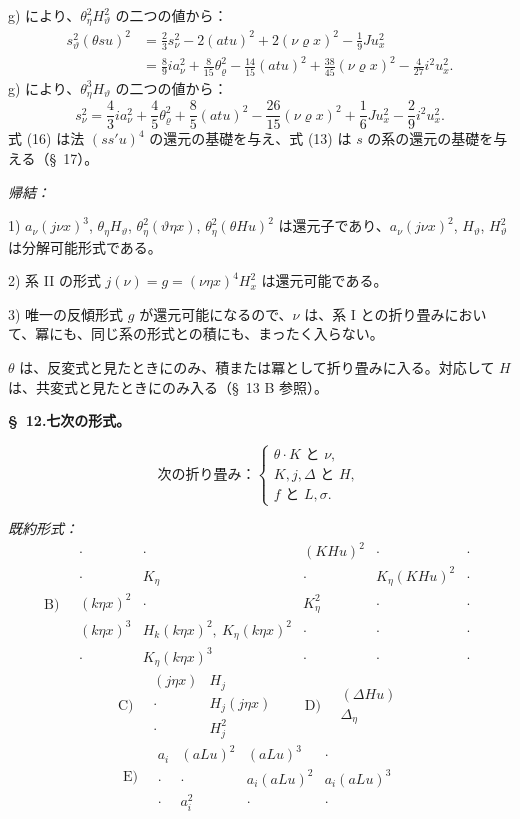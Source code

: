 \documentclass[11pt]{jlreq}
\newcommand{\A}{\Delta}
\newcommand{\R}{\varrho}
\begin{document}
g) により、$\theta_\eta^2H_\vartheta^2$ の二つの値から：
\[
\tag{15}
\begin{aligned}
s_\vartheta^2(\theta su)^2
&=\frac23s_\nu^2-2(atu)^2+2(\nu\R x)^2-\frac19Ju_x^2\\
&=\frac89ia_\nu^2+\frac8{15}\theta_\R^2-\frac{14}{15}(atu)^2+\frac{38}{45}(\nu\R x)^2-\frac4{27}i^2u_x^2.
\end{aligned}
\]
g) により、$\theta_\eta^3H_\vartheta$ の二つの値から：
\[
\tag{16}
s_\nu^2=\frac43ia_\nu^2+\frac45\theta_\R^2+\frac85(atu)^2-\frac{26}{15}(\nu\R x)^2+\frac16Ju_x^2-\frac29i^2u_x^2.
\]
式 (16) は法 $(ss'u)^4$ の還元の基礎を与え、式 (13) は $s$ の系の還元の基礎を与える（\S\ 17）。

\noindent\emph{帰結：}

1) $a_\nu(j\nu x)^3$, $\theta_\eta H_\vartheta$, $\theta_\eta^2(\vartheta\eta x)$, $\theta_\eta^2(\theta Hu)^2$ は還元子であり、$a_\nu(j\nu x)^2$, $H_\vartheta$, $H_\vartheta^2$ は分解可能形式である。

2) 系 II の形式 $j(\nu)=g=(\nu\eta x)^4H_x^2$ は還元可能である。

3) 唯一の反傾形式 $g$ が還元可能になるので、$\nu$ は、系 I との折り畳みにおいて、冪にも、同じ系の形式との積にも、まったく入らない。

$\theta$ は、反変式と見たときにのみ、積または冪として折り畳みに入る。対応して $H$ は、共変式と見たときにのみ入る（\S\ 13 B 参照）。




\begin{center}
\textbf{\S\ 12.\quad 七次の形式。}
\end{center}
\[
\text{次の折り畳み：}\left\{\begin{array}{l}
\theta\cdot K\text{ と }\nu,\\
K,j,\A\text{ と }H,\\
f\text{ と }L,\sigma.
\end{array}\right.
\]

\noindent\emph{既約形式：}
\[
\text{B)}\quad
\begin{array}{c|c|c|c|c}
\cdot&\cdot&(KHu)^2&\cdot&\cdot\\
\cdot&K_\eta&\cdot&K_\eta(KHu)^2&\cdot\\
(k\eta x)^2&\cdot&K_\eta^2&\cdot&\cdot\\
(k\eta x)^3&H_k(k\eta x)^2,\ K_\eta(k\eta x)^2&\cdot&\cdot&\cdot\\
\cdot&K_\eta(k\eta x)^3&\cdot&\cdot&\cdot
\end{array}
\]
\[
\text{C)}\quad
\begin{array}{cc}
(j\eta x)&H_j\\
\cdot&H_j(j\eta x)\\
\cdot&H_j^2
\end{array}
\qquad
\text{D)}\quad
\begin{array}{c}
(\A Hu)\\\A_\eta
\end{array}
\]
\[
\text{E)}\quad
\begin{array}{cccc}
a_i&(aLu)^2&(aLu)^3&\cdot\\
\cdot&\cdot&a_i(aLu)^2&a_i(aLu)^3\\
\cdot&a_i^2&\cdot&\cdot
\end{array}
\]
\end{document}
